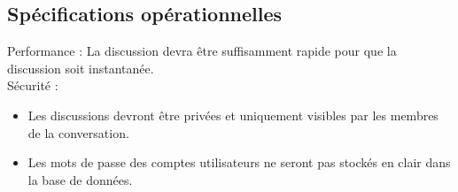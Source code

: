 	
\subsection{Spécifications opérationnelles}

Performance : La discussion devra être suffisamment rapide pour que la discussion soit instantanée. \\

Sécurité : \\

\begin{itemize}
	\item Les discussions devront être privées et uniquement visibles par les membres de la conversation. 
	\item Les mots de passe des comptes utilisateurs ne seront pas stockés en clair dans la base de données.
\end{itemize}




